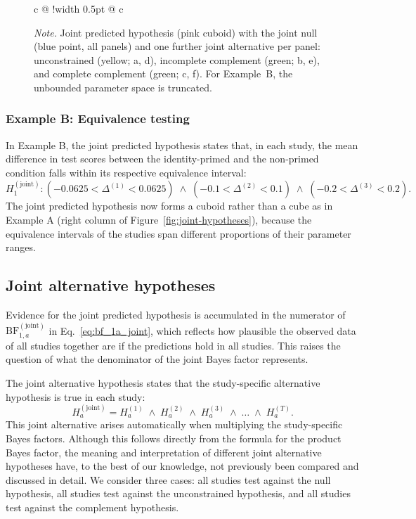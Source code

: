 \documentclass[letterpaper,11pt,oneside]{article}
\begin{document}
\begin{figure}[!tbp]
\begin{tabular}{c @{\hspace{30pt}} !{\vrule width 0.5pt} @{\hspace{30pt}} c}
\end{tabular}

\vspace{15pt}

\begin{minipage}{\textwidth}
\raggedright
\footnotesize
\textit{Note.} Joint predicted hypothesis (pink cuboid) with the joint null (blue point, all panels) and one further joint alternative per panel: unconstrained (yellow; a, d), incomplete complement (green; b, e), and complete complement (green; c, f). For Example~B, the unbounded parameter space is truncated.
\end{minipage}

\end{figure}

\subsubsection{Example B: Equivalence testing}

In Example B, the joint predicted hypothesis states that, in each study, the mean difference in test scores between the identity-primed and the non-primed condition falls within its respective equivalence interval:
    \[
    H_{1}^{(\text{joint})}:
    \left(-0.0625 < \Delta^{(1)} < 0.0625\right)
    \;\land\;
    \left(-0.1 < \Delta^{(2)} < 0.1\right)
    \;\land\;
    \left(-0.2 < \Delta^{(3)} < 0.2\right).
    \]
The joint predicted hypothesis now forms a cuboid rather than a cube as in Example A (right column of Figure~\ref{fig:joint-hypotheses}), because the equivalence intervals of the studies span different proportions of their parameter ranges.

\subsection{Joint alternative hypotheses}
\label{sec:joint-alternative-hypotheses}

Evidence for the joint predicted hypothesis is accumulated in the numerator of $\text{BF}_{1,a}^{(\text{joint})}$ in Eq.~\eqref{eq:bf_1a_joint}, which reflects how plausible the observed data of all studies together are if the predictions hold in all studies. This raises the question of what the denominator of the joint Bayes factor represents.

The joint alternative hypothesis states that the study-specific alternative hypothesis is true in each study:
    \[
    H_a^{(\text{joint})} = H_a^{(1)} \;\land\; H_a^{(2)} \;\land\; H_a^{(3)} \;\land\; \dots \;\land\; H_a^{(T)}.
    \]
This joint alternative arises automatically when multiplying the study-specific Bayes factors. Although this follows directly from the formula for the product Bayes factor, the meaning and interpretation of different joint alternative hypotheses have, to the best of our knowledge, not previously been compared and discussed in detail. We consider three cases: all studies test against the null hypothesis, all studies test against the unconstrained hypothesis, and all studies test against the complement hypothesis.
\end{document}
